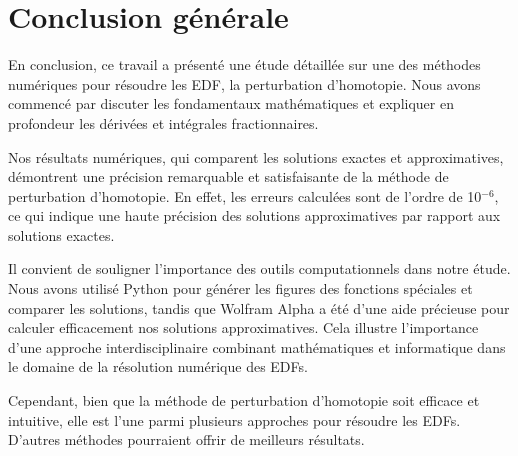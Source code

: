 


\chapter{Conclusion générale}
\label{chap:Conclusion}
\pagestyle{fancy}

En conclusion, ce travail a présenté une étude détaillée sur une des méthodes numériques pour résoudre les EDF, la perturbation d'homotopie. Nous avons commencé par discuter les fondamentaux mathématiques et expliquer en profondeur les dérivées et intégrales fractionnaires.

Nos résultats numériques, qui comparent les solutions exactes et approximatives, démontrent une précision remarquable et satisfaisante de la méthode de perturbation d'homotopie. En effet, les erreurs calculées sont de l'ordre de 10$^{-6}$, ce qui indique une haute précision des solutions approximatives par rapport aux solutions exactes.

Il convient de souligner l'importance des outils computationnels dans notre étude. Nous avons utilisé Python pour générer les figures des fonctions spéciales et comparer les solutions, tandis que Wolfram Alpha a été d'une aide précieuse pour calculer efficacement nos solutions approximatives. Cela illustre l'importance d'une approche interdisciplinaire combinant mathématiques et informatique dans le domaine de la résolution numérique des EDFs.

Cependant, bien que la méthode de perturbation d'homotopie soit efficace et intuitive, elle est l'une parmi plusieurs approches pour résoudre les EDFs. D'autres méthodes pourraient offrir de meilleurs résultats.
